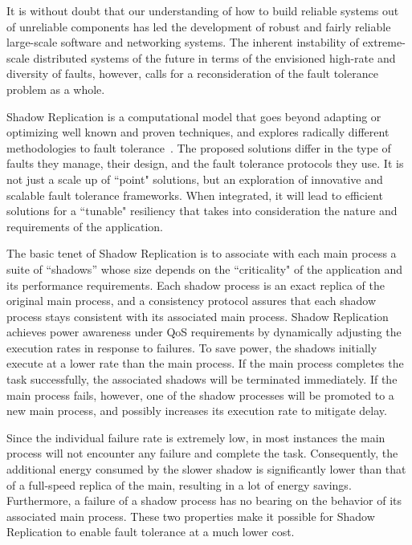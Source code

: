 It is without doubt that our understanding of how to build reliable systems out of unreliable components has led the development of robust and fairly reliable large-scale software and networking systems. The inherent instability of extreme-scale distributed systems of the future in terms of the envisioned high-rate and diversity of faults, however, calls for a reconsideration of the fault tolerance problem as a whole. %

Shadow Replication is a computational model that goes beyond adapting or optimizing well known and proven techniques, and explores radically different methodologies to fault tolerance~\cite{mills_2014_icnc,mills_2014_pdp,mills2014power}. %
The proposed solutions differ in the type of faults they manage, their design, and the fault tolerance protocols they use. It is not just a scale up of  ``point" solutions, but an exploration of innovative and scalable fault tolerance frameworks. 
When integrated, it will lead to efficient solutions for a ``tunable" resiliency that takes into consideration the nature and requirements of the application.

The basic tenet of Shadow Replication is to associate with each main process a suite of “shadows” whose size depends on the 
``criticality" of the application and its performance requirements. Each shadow process is an exact replica of the original 
main process, 
and a consistency protocol assures that each shadow process stays consistent with its associated main process.  
Shadow Replication achieves power awareness under QoS requirements by dynamically adjusting the execution rates in response to failures. 
To save power, the shadows initially execute at a lower rate than the main process.
If the main process completes the task successfully, the associated shadows will be terminated immediately. If the main process fails, however, one of the shadow processes will be promoted to a new main process, and possibly increases its execution rate to mitigate delay.

Since the individual failure rate is extremely low, in most instances the main process will not encounter any failure and complete the task. 
Consequently, the additional energy consumed by the
slower shadow is significantly lower than that of a full-speed replica of the
main, resulting in a lot of energy savings. Furthermore, a failure of a shadow process has no bearing on the behavior of its associated main process. These two properties make it possible for Shadow Replication to enable fault tolerance at a much lower cost.

